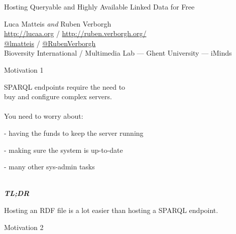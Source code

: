 \documentclass[20pt]{extarticle}
\begin{document}
\begin{center}

\vspace*{\fill}


{\fontsize{40}{40} \sc Hosting Queryable and Highly Available Linked Data for Free}\\

\vspace{10 mm}

{\cmr Luca Matteis \textit{and} Ruben Verborgh}
\\
{\cmr \url{http://lucaa.org} / \url{http://ruben.verborgh.org/}}
\\
{\cmr \href{https://twitter.com/lmatteis}{@lmatteis} / \href{https://twitter.com/RubenVerborgh}{@RubenVerborgh}}
\\
{\cmr \small Bioversity International / Multimedia Lab --- Ghent University --- iMinds}


\vspace*{\fill}
\end{center}

\newpage

\begin{center}
{\fontsize{35}{35}\color{blue} \sc Motivation 1}
\end{center}

\vspace{10 mm}

{\fontsize{25}{25} {\cmr 
\noindent SPARQL endpoints require the need to \\{\color{blue}buy and configure complex servers}.
\\ \\
You need to worry about: 

- having the funds to keep the server running

- making sure the system is up-to-date

- many other sys-admin tasks
\\ \\
{\color{blue} 
\textbf{\textit{TL;DR}}

Hosting an RDF file is a lot easier than hosting a SPARQL endpoint. 
}
}}

\newpage
 
 
\begin{center}
{\fontsize{35}{35}\color{blue} \sc Motivation 2}
\end{center}
\end{document}
